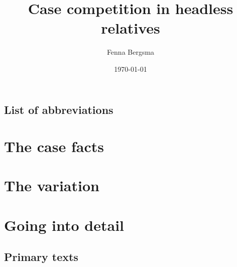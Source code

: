 \documentclass[11pt,hidelinks]{memoir}
\title{Case competition in headless relatives}
\author{Fenna Bergsma}
\date{\today}
\begin{document}

\frontmatter

\begin{titlingpage}
  \maketitle
\end{titlingpage}

\clearpage
\tableofcontents

\clearpage
\listoftables

\chapter*{List of abbreviations}
\begingroup
  \setlength{\LTleft}{-\tabcolsep}
\printacronyms[include=abbr, heading=none]
\endgroup
{}


\mainmatter
\setcounter{secnumdepth}{4}



\part{The case facts}\label{part:case-facts}



\part{The variation}\label{part:variation}



\part{Going into detail}\label{part:details}





\backmatter

\clearpage
\chapter*{Primary texts}
\begingroup
  \setlength{\LTleft}{-\tabcolsep}
\printacronyms[include=texts, heading=none]
\endgroup
{}

\newrefcontext[sorting=nyt]
\printbibliography

\end{document}
